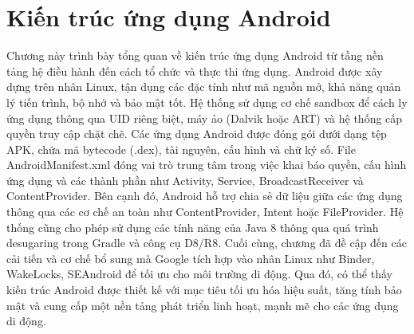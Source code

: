 \chapter{Kiến trúc ứng dụng Android}
\label{chap:Chap}
Chương này trình bày tổng quan về kiến trúc ứng dụng Android từ tầng nền tảng hệ điều hành đến cách tổ chức và thực thi ứng dụng. Android được xây dựng trên nhân Linux, tận dụng các đặc tính như mã nguồn mở, khả năng quản lý tiến trình, bộ nhớ và bảo mật tốt. Hệ thống sử dụng cơ chế sandbox để cách ly ứng dụng thông qua UID riêng biệt, máy ảo (Dalvik hoặc ART) và hệ thống cấp quyền truy cập chặt chẽ. Các ứng dụng Android được đóng gói dưới dạng tệp APK, chứa mã bytecode (.dex), tài nguyên, cấu hình và chữ ký số. File AndroidManifest.xml đóng vai trò trung tâm trong việc khai báo quyền, cấu hình ứng dụng và các thành phần như Activity, Service, BroadcastReceiver và ContentProvider. Bên cạnh đó, Android hỗ trợ chia sẻ dữ liệu giữa các ứng dụng thông qua các cơ chế an toàn như ContentProvider, Intent hoặc FileProvider. Hệ thống cũng cho phép sử dụng các tính năng của Java 8 thông qua quá trình desugaring trong Gradle và công cụ D8/R8. Cuối cùng, chương đã đề cập đến các cải tiến và cơ chế bổ sung mà Google tích hợp vào nhân Linux như Binder, WakeLocks, SEAndroid để tối ưu cho môi trường di động. Qua đó, có thể thấy kiến trúc Android được thiết kế với mục tiêu tối ưu hóa hiệu suất, tăng tính bảo mật và cung cấp một nền tảng phát triển linh hoạt, mạnh mẽ cho các ứng dụng di động.




